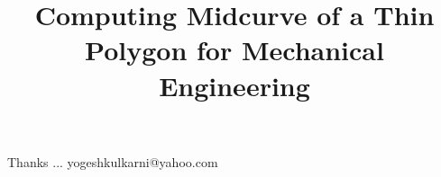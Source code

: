\documentclass[xcolor=dvipsnames,compress,t,pdf,9pt]{beamer}
\title[\insertframenumber /\inserttotalframenumber]{Computing Midcurve of a Thin Polygon for Mechanical Engineering}
\begin{document}
	\begin{frame}
	\titlepage
%
	\end{frame}
	
%	
	
	
	\begin{frame}[c]{}
	Thanks ...
	\vspace{5mm}
	yogeshkulkarni@yahoo.com
	\end{frame}
\end{document}
